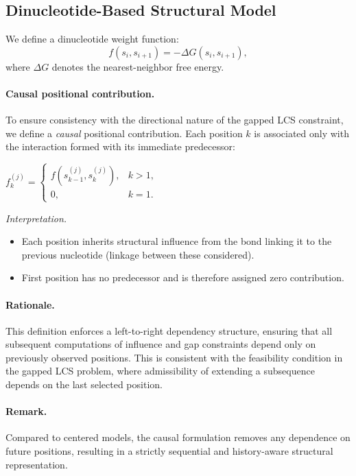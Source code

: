 \documentclass[11pt,a4paper]{article}
\begin{document}
 
\subsection{Dinucleotide-Based Structural Model}

We define a dinucleotide weight function:
$$
f(s_i, s_{i+1}) = -\Delta G(s_i, s_{i+1}),
$$
where $\Delta G$ denotes the nearest-neighbor free energy.

\paragraph{Causal positional contribution.}

To ensure consistency with the directional nature of the gapped LCS constraint, we define a \emph{causal} positional contribution. Each position $k$ is associated only with the interaction formed with its immediate predecessor:

$
f^{(j)}_k =
\begin{cases}
	f(s^{(j)}_{k-1}, s^{(j)}_k), & k > 1, \ \\
	0, & k = 1.
\end{cases}
$

\textit{Interpretation.} \begin{itemize}
	\item Each position inherits structural influence from the bond linking it to the previous nucleotide (linkage between these considered).
	\item First position has no predecessor and is therefore assigned zero contribution.
\end{itemize}

\paragraph{Rationale.}
This definition enforces a left-to-right dependency structure, ensuring that all subsequent computations of influence and gap constraints depend only on previously observed positions. This is consistent with the feasibility condition in the gapped LCS problem, where admissibility of extending a subsequence depends on the last selected position.

\paragraph{Remark.}
Compared to centered models, the causal formulation removes any dependence on future positions, resulting in a strictly sequential and history-aware structural representation.
\end{document}
